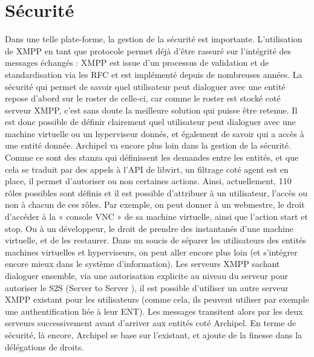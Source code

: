     \section{Sécurité}
Dans une telle plate-forme, la gestion de la sécurité est importante. L'utilisation de XMPP en tant que protocole permet déjà d'être rassuré sur l'intégrité des messages échangés : XMPP est issue d'un processus de validation et de standardisation via les RFC et est implémenté depuis de nombreuses années.
\newline
La sécurité qui permet de savoir quel utilisateur peut dialoguer avec une entité repose d'abord sur le roster de celle-ci, car comme le roster est stocké coté serveur XMPP, c'est sans doute la meilleure solution qui puisse être retenue. Il est donc possible de définir clairement quel utilisateur peut dialoguer avec une machine virtuelle ou un hyperviseur donnés, et également de savoir qui a accès à une entité donnée. Archipel va encore plus loin dans la gestion de la sécurité. Comme ce sont des stanza qui définissent les demandes entre les entités, et que cela se traduit par des appels à l'API de libvirt, un filtrage coté agent
est en place, il permet d'autoriser ou non certaines actions. Ainsi, actuellement, 110 rôles possibles sont
définis et il est possible d'attribuer à un utilisateur, l'accès ou non à chacun de ces rôles. Par exemple, on
peut donner à un webmestre, le droit d’accéder à la « console VNC » de sa machine virtuelle, ainsi que
l'action start et stop. Ou à un développeur, le droit de prendre des instantanés d'une machine virtuelle, et
de les restaurer.\newline
Dans un soucis de séparer les utilisateurs des entités machines virtuelles et hyperviseurs, on peut aller
encore plus loin (et s'intégrer encore mieux dans le système d'information). Les serveurs XMPP sachant
dialoguer ensemble, via une autorisation explicite au niveau du serveur pour autoriser le S2S (Server to
Server ), il est possible d'utiliser un autre serveur XMPP existant pour les utilisateurs (comme cela, ils
peuvent utiliser par exemple une authentification liée à leur ENT). Les messages transitent alors par les
deux serveurs successivement avant d'arriver aux entités coté Archipel.\newline
En terme de sécurité, là encore, Archipel se base sur l'existant, et ajoute de la finesse dans la délégations
de droits.\newline
